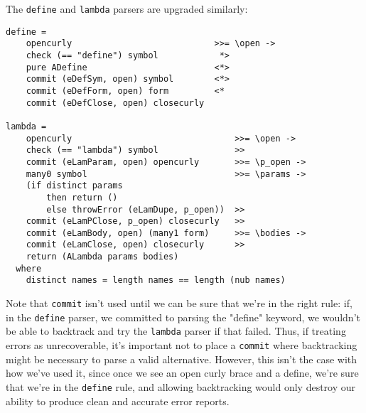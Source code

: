 \documentclass{tmr}
\begin{document}
The \verb+define+ and \verb+lambda+ parsers are upgraded similarly:
\begin{verbatim}
define =
    opencurly                            >>= \open ->
    check (== "define") symbol            *>
    pure ADefine                         <*>
    commit (eDefSym, open) symbol        <*>
    commit (eDefForm, open) form         <*
    commit (eDefClose, open) closecurly  

lambda =
    opencurly                                >>= \open ->
    check (== "lambda") symbol               >>
    commit (eLamParam, open) opencurly       >>= \p_open ->
    many0 symbol                             >>= \params ->
    (if distinct params 
        then return ()
        else throwError (eLamDupe, p_open))  >>
    commit (eLamPClose, p_open) closecurly   >>
    commit (eLamBody, open) (many1 form)     >>= \bodies ->
    commit (eLamClose, open) closecurly      >>
    return (ALambda params bodies)
  where
    distinct names = length names == length (nub names)
\end{verbatim}
Note that \verb+commit+ isn't used until we can be sure that we're in the right 
rule:  if, in the \verb+define+ parser, we committed to parsing the "define" 
keyword, we wouldn't be able to backtrack and try the \verb+lambda+ parser if 
that failed.  Thus, if treating errors as unrecoverable, it's important not to 
place a \verb+commit+ where backtracking might be necessary to parse a valid 
alternative.  However, this isn't the case with how we've used it, since once 
we see an open curly brace and a define, we're sure that we're in the \verb+define+
rule, and allowing backtracking would only destroy our ability to produce clean 
and accurate error reports.
\end{document}
